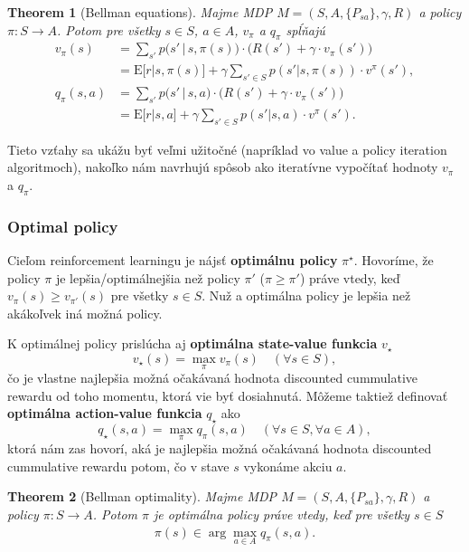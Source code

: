 \documentclass[letterpaper,12pt]{article}
\newtheorem*{thm*}{Theorem}
\begin{document}
\begin{thm*}[Bellman equations]
Majme MDP $M = \left(S, A, \{ P_{sa} \}, \gamma, R\right)$ a policy $\pi: S \to A$. Potom pre všetky $s \in S$, $a \in A$, $v_\pi$ a $q_\pi$ spĺňajú 
\begin{align*}
v_\pi (s) &= \sum\limits_{s'} p\big(s'\,|\,s, \pi(s)\big) \cdot \big(R(s') + \gamma \cdot v_\pi (s')\big)\\
 &= \mathrm{E}\big[r|s, \pi(s)\big] + \gamma \sum_{s' \in S} p(s'|s,\pi(s)) \cdot v^\pi(s'),\\
q_\pi (s,a) &= \sum\limits_{s'} p\big(s'\,|\,s, a\big) \cdot \big(R(s') + \gamma \cdot v_\pi (s')\big)\\
 &= \mathrm{E}\big[r|s,a\big] + \gamma \sum_{s' \in S} p(s'|s,a) \cdot v^\pi(s').
\end{align*}
\end{thm*}
\noindent Tieto vzťahy sa ukážu byť veľmi užitočné (napríklad vo value a policy iteration algoritmoch), nakoľko nám navrhujú spôsob ako iteratívne vypočítať hodnoty $v_\pi$ a $q_\pi$.

\subsubsection*{Optimal policy}
\indent\par Cieľom reinforcement learningu je nájsť \textbf{optimálnu policy} {\boldmath $\pi^\star$}. Hovoríme, že policy $\pi$ je lepšia/optimálnejšia než policy $\pi'$  ($\pi \geq \pi'$) práve vtedy, keď $v_\pi(s) \geq v_{\pi'}(s)$ pre všetky $s \in S$. Nuž a optimálna policy je lepšia než akákoľvek iná možná policy.

K optimálnej policy prislúcha aj \textbf{optimálna state-value funkcia} {\boldmath $v_\star$}
$$v_\star (s) = \max\limits_{\pi} v_\pi(s) \quad (\forall s \in S),$$
čo je vlastne najlepšia možná očakávaná hodnota discounted cummulative rewardu od toho momentu, ktorá vie byť dosiahnutá.
Môžeme taktiež definovať \textbf{optimálna action-value funkcia} {\boldmath $q_\star$} ako
$$q_\star (s,a) = \max\limits_{\pi} q_\pi(s,a) \quad (\forall s \in S, \forall a \in A),$$
ktorá nám zas hovorí, aká je najlepšia možná očakávaná hodnota discounted cummulative rewardu potom, čo v stave $s$ vykonáme akciu $a$.

\begin{thm*}[Bellman optimality]
Majme MDP $M = \left(S, A, \{ P_{sa} \}, \gamma, R\right)$ a policy $\pi: S \to A$. Potom $\pi$ je optimálna policy práve vtedy, keď pre všetky $s \in S$
\begin{align*}
\pi (s) \in \arg\max\limits_{a \in A} q_\pi(s,a).
\end{align*}
\end{thm*}
\end{document}
